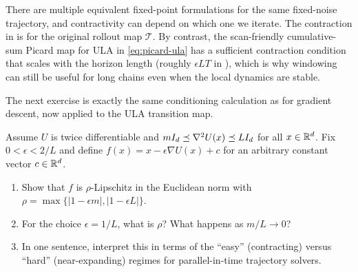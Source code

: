 \documentclass[11pt]{article}
\newif\ifshowsolutions
\newcommand{\SolutionBox}[2][10]{%
  \ifshowsolutions
    \begin{tcolorbox}[stat221panelgray,title={Solution}]
    #2
    \end{tcolorbox}
  \else
    \begin{tcolorbox}[stat221panelgray,unbreakable,title={Workspace}]
    \vspace{#1\baselineskip}
    \end{tcolorbox}
  \fi
}
\begin{document}
There are multiple equivalent fixed-point formulations for the same fixed-noise trajectory, and contractivity can depend on which one we iterate.
The contraction in  is for the original rollout map $\mathcal{T}$.
By contrast, the scan-friendly cumulative-sum Picard map for ULA in \eqref{eq:picard-ula} has a sufficient contraction condition that scales with the horizon length (roughly $\epsilon L T$ in ), which is why windowing can still be useful for long chains even when the local dynamics are stable.%

The next exercise is exactly the same conditioning calculation as for gradient descent, now applied to the ULA transition map.
\begin{exercise}
\label{ex:ula-contractive-step}
Assume $U$ is twice differentiable and $m I_d \preceq \nabla^2 U(x) \preceq L I_d$ for all $x\in\mathbb{R}^d$.
Fix $0<\epsilon<2/L$ and define $f(x)=x-\epsilon\nabla U(x)+c$ for an arbitrary constant vector $c\in\mathbb{R}^d$.
\begin{enumerate}[leftmargin=*]
  \item Show that $f$ is $\rho$-Lipschitz in the Euclidean norm with $\rho=\max\{|1-\epsilon m|,|1-\epsilon L|\}$.
  \item For the choice $\epsilon=1/L$, what is $\rho$? What happens as $m/L\to 0$?
  \item In one sentence, interpret this in terms of the ``easy'' (contracting) versus ``hard'' (near-expanding) regimes for parallel-in-time trajectory solvers.
\end{enumerate}
\end{exercise}
\SolutionBox[14]{%
\begin{enumerate}[leftmargin=*]
  \item The Jacobian is $Df(x)=I_d-\epsilon \Hess U(x)$.
  Since the Hessian eigenvalues lie in $[m,L]$, the eigenvalues of $Df(x)$ lie in $[1-\epsilon L,\,1-\epsilon m]$, so
  \[
    \norm{Df(x)}_{\mathrm{op}}
    =\max_{\lambda\in[m,L]}|1-\epsilon\lambda|
    =\max\{|1-\epsilon m|,|1-\epsilon L|\}
    =\rho.
  \]
  The mean value theorem then yields $\norm{f(x)-f(y)}_2\le \rho\norm{x-y}_2$ for all $x,y$.
  \item If $\epsilon=1/L$, then $\rho=\max\{1-m/L,\;|0|\}=1-m/L$.
  As $m/L\to 0$, we have $\rho\to 1$, meaning the step becomes only weakly contractive (nearly nonexpansive) and perturbations decay very slowly.
  \item When the dynamics are strongly contractive (small $\rho$), errors do not amplify across time and both Picard and Gauss--Newton iterations tend to have large basins and behave robustly; when the map is near-expansive ($\rho\approx 1$) or expansive, errors can propagate and the trajectory solve can require damping/windows and many more iterations.%
\end{enumerate}
}
\end{document}
